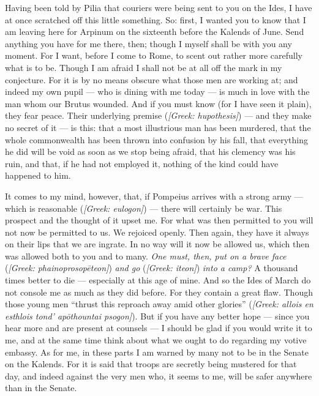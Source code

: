

 Having been told by Pilia that couriers were being sent to you on the Ides, I have at once scratched off this little something. So: first, I wanted you to know that I am leaving here for Arpinum on the sixteenth before the Kalends of June. Send anything you have for me there, then; though I myself shall be with you any moment. For I want, before I come to Rome, to scent out rather more carefully what is to be. Though I am afraid I shall not be at all off the mark in my conjecture. For it is by no means obscure what those men are working at; and indeed my own pupil --- who is dining with me today --- is much in love with the man whom our Brutus wounded. And if you must know (for I have seen it plain), they fear peace. Their underlying premise (\textit{[Greek: hupothesis]}) --- and they make no secret of it --- is this: that a most illustrious man has been murdered, that the whole commonwealth has been thrown into confusion by his fall, that everything he did will be void as soon as we stop being afraid, that his clemency was his ruin, and that, if he had not employed it, nothing of the kind could have happened to him.

 It comes to my mind, however, that, if Pompeius arrives with a strong army --- which is reasonable (\textit{[Greek: eulogon]}) --- there will certainly be war. This prospect and the thought of it upset me. For what was then permitted to you will not now be permitted to us. We rejoiced openly. Then again, they have it always on their lips that we are ingrate. In no way will it now be allowed us, which then was allowed both to you and to many. \textit{One must, then, put on a brave face} (\textit{[Greek: phainoprosop\=eteon]}) \textit{and go} (\textit{[Greek: iteon]}) \textit{into a camp?} A thousand times better to die --- especially at this age of mine. And so the Ides of March do not console me as much as they did before. For they contain a great flaw. Though those young men ``thrust this reproach away amid other glories'' (\textit{[Greek: allois en esthlois tond' ap\=othountai psogon]}). But if you have any better hope --- since you hear more and are present at counsels --- I should be glad if you would write it to me, and at the same time think about what we ought to do regarding my votive embassy. As for me, in these parts I am warned by many not to be in the Senate on the Kalends. For it is said that troops are secretly being mustered for that day, and indeed against the very men who, it seems to me, will be safer anywhere than in the Senate.
